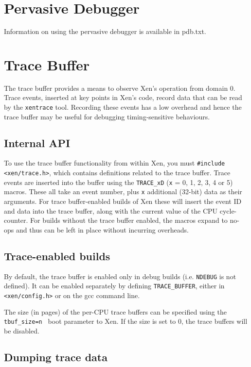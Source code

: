 \documentclass[11pt,twoside,final,openright]{xenstyle}
\begin{document}
\section{Pervasive Debugger}

Information on using the pervasive debugger is available in pdb.txt.


\section{Trace Buffer}

The trace buffer provides a means to observe Xen's operation from domain 0.
Trace events, inserted at key points in Xen's code, record data that can be
read by the {\tt xentrace} tool.  Recording these events has a low overhead
and hence the trace buffer may be useful for debugging timing-sensitive
behaviours.

\subsection{Internal API}

To use the trace buffer functionality from within Xen, you must {\tt \#include
<xen/trace.h>}, which contains definitions related to the trace buffer.  Trace
events are inserted into the buffer using the {\tt TRACE\_xD} ({\tt x} = 0, 1,
2, 3, 4 or 5) macros.  These all take an event number, plus {\tt x} additional
(32-bit) data as their arguments.  For trace buffer-enabled builds of Xen these
will insert the event ID and data into the trace buffer, along with the current
value of the CPU cycle-counter.  For builds without the trace buffer enabled,
the macros expand to no-ops and thus can be left in place without incurring
overheads.

\subsection{Trace-enabled builds}

By default, the trace buffer is enabled only in debug builds (i.e. {\tt NDEBUG}
is not defined).  It can be enabled separately by defining {\tt TRACE\_BUFFER},
either in {\tt <xen/config.h>} or on the gcc command line.

The size (in pages) of the per-CPU trace buffers can be specified using the
{\tt tbuf\_size=n } boot parameter to Xen.  If the size is set to 0, the trace
buffers will be disabled.

\subsection{Dumping trace data}
\end{document}
